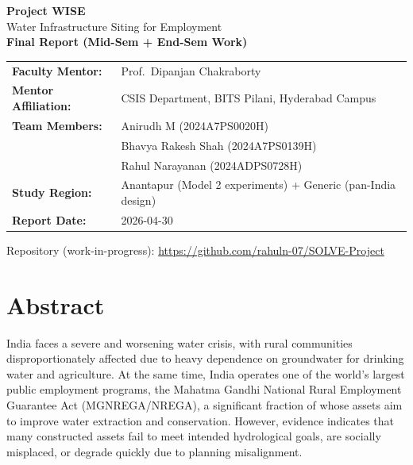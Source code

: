 \documentclass[12pt,a4paper]{report}
\newcommand{\ProjectTitle}{Project WISE}
\newcommand{\ProjectSubtitle}{Water Infrastructure Siting for Employment}
\newcommand{\MentorName}{Prof.\ Dipanjan Chakraborty}
\newcommand{\MentorDept}{CSIS Department, BITS Pilani, Hyderabad Campus}
\newcommand{\StudentA}{Rahul Narayanan (2024ADPS0728H)}
\newcommand{\StudentB}{Bhavya Rakesh Shah (2024A7PS0139H)}
\newcommand{\StudentC}{Anirudh M (2024A7PS0020H)}
\newcommand{\ReportDate}{2026-04-30}
\newcommand{\StudyRegion}{Anantapur (Model 2 experiments) + Generic (pan-India design)}
\begin{document}
\begin{titlepage}
  \centering

  \vspace*{0.5cm}
  \begin{figure}[h!]
    \centering
    
  \end{figure}

  {\Large \textbf{\ProjectTitle}}\\[0.2cm]
  {\large \ProjectSubtitle}\\[0.7cm]

  {\large \textbf{Final Report (Mid-Sem + End-Sem Work)}}\\[0.8cm]

  \begin{tabular}{>{\bfseries}p{} p{}}
    Faculty Mentor: & \MentorName\\
    Mentor Affiliation: & \MentorDept\\
    Team Members: & \StudentC\\
    & \StudentB\\ & \StudentA\\
    Study Region: & \StudyRegion\\
    Report Date: & \ReportDate\\
  \end{tabular}

  \vfill
  {\small Repository (work-in-progress): \url{https://github.com/rahuln-07/SOLVE-Project}}\\
  \vspace*{0.5cm}
\end{titlepage}

\tableofcontents
\listoftables
\listoffigures
\clearpage

\chapter*{Abstract}
India faces a severe and worsening water crisis, with rural communities disproportionately affected due to heavy dependence on groundwater for drinking water and agriculture. At the same time, India operates one of the world’s largest public employment programs, the Mahatma Gandhi National Rural Employment Guarantee Act (MGNREGA/NREGA), a significant fraction of whose assets aim to improve water extraction and conservation. However, evidence indicates that many constructed assets fail to meet intended hydrological goals, are socially misplaced, or degrade quickly due to planning misalignment.
\end{document}

